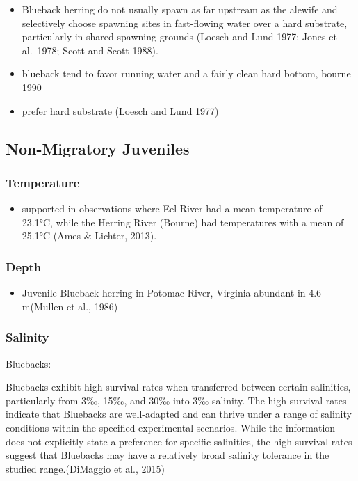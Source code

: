 \documentclass[
]{book}
\providecommand{\tightlist}{%
  \setlength{\itemsep}{0pt}\setlength{\parskip}{0pt}}
\begin{document}
\begin{itemize}
\item
  Blueback herring do not usually spawn as far upstream as the alewife and selectively choose spawning sites in fast-flowing water over a hard substrate, particularly in shared spawning grounds (Loesch and Lund 1977; Jones et al.~1978; Scott and Scott 1988).
\item
  blueback tend to favor running water and a fairly clean hard bottom, bourne 1990
\item
  prefer hard substrate (Loesch and Lund 1977)
\end{itemize}

\hypertarget{non-migratory-juveniles-2}{%
\subsection{Non-Migratory Juveniles}\label{non-migratory-juveniles-2}}

\hypertarget{temperature-4}{%
\subsubsection{Temperature}\label{temperature-4}}

\begin{itemize}
\tightlist
\item
  supported in observations where Eel River had a mean temperature of 23.1°C, while the Herring River (Bourne) had temperatures with a mean of 25.1°C (Ames \& Lichter, 2013).
\end{itemize}

\hypertarget{depth-4}{%
\subsubsection{Depth}\label{depth-4}}

\begin{itemize}
\tightlist
\item
  Juvenile Blueback herring in Potomac River, Virginia abundant in 4.6 m(Mullen et al., 1986)
\end{itemize}

\hypertarget{salinity-4}{%
\subsubsection{Salinity}\label{salinity-4}}

Bluebacks:

Bluebacks exhibit high survival rates when transferred between certain salinities, particularly from 3‰, 15‰, and 30‰ into 3‰ salinity.
The high survival rates indicate that Bluebacks are well-adapted and can thrive under a range of salinity conditions within the specified experimental scenarios.
While the information does not explicitly state a preference for specific salinities, the high survival rates suggest that Bluebacks may have a relatively broad salinity tolerance in the studied range.(DiMaggio et al., 2015)
\end{document}
